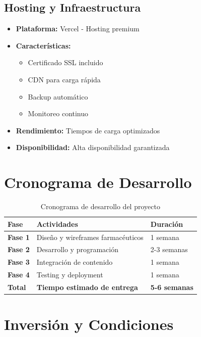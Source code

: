 \documentclass[12pt,a4paper]{article}
\begin{document}
\subsection{Hosting y Infraestructura}
\begin{itemize}
    \item \textbf{Plataforma:} Vercel - Hosting premium
    \item \textbf{Características:}
    \begin{itemize}
        \item Certificado SSL incluido
        \item CDN para carga rápida
        \item Backup automático
        \item Monitoreo continuo
    \end{itemize}
    \item \textbf{Rendimiento:} Tiempos de carga optimizados
    \item \textbf{Disponibilidad:} Alta disponibilidad garantizada
\end{itemize}

\section{Cronograma de Desarrollo}

\begin{table}[h]
\centering
\begin{tabularx}{\textwidth}{|l|X|l|}
\hline
\textbf{Fase} & \textbf{Actividades} & \textbf{Duración} \\
\hline
\textbf{Fase 1} & Diseño y wireframes farmacéuticos & 1 semana \\
\hline
\textbf{Fase 2} & Desarrollo y programación & 2-3 semanas \\
\hline
\textbf{Fase 3} & Integración de contenido & 1 semana \\
\hline
\textbf{Fase 4} & Testing y deployment & 1 semana \\
\hline
\textbf{Total} & \textbf{Tiempo estimado de entrega} & \textbf{5-6 semanas} \\
\hline
\end{tabularx}
\caption{Cronograma de desarrollo del proyecto}
\end{table}

\section{Inversión y Condiciones}
\end{document}
